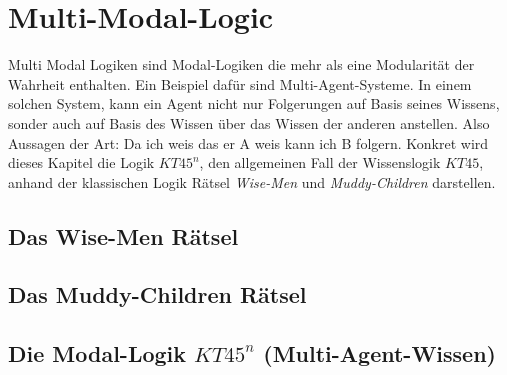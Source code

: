 

\section{Multi-Modal-Logic} %
\label{sec:multi_modal_logic}
Multi Modal Logiken sind Modal-Logiken die mehr als eine Modularität der Wahrheit enthalten.
Ein Beispiel dafür sind Multi-Agent-Systeme. In einem solchen System, kann ein Agent nicht nur Folgerungen auf Basis seines Wissens, sonder auch auf Basis des Wissen über das Wissen der anderen anstellen. Also Aussagen der Art: Da ich weis das er A weis kann ich B folgern.
Konkret wird dieses Kapitel die Logik $KT45^n$, den allgemeinen Fall der Wissenslogik $KT45$, anhand der klassischen Logik Rätsel \emph{Wise-Men} und \emph{Muddy-Children} darstellen.

\subsection{Das Wise-Men Rätsel} %
\label{sub:das_wise_men_raetsel}


\subsection{Das Muddy-Children Rätsel} %
\label{sub:das_muddy_children_raetsel}


\subsection{Die Modal-Logik $KT45^n$ (Multi-Agent-Wissen)} %
\label{sub:the_modal_logic_kt45_n_}


